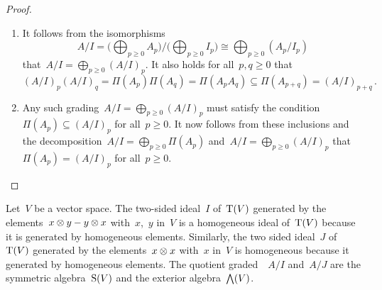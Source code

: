 \begin{proof}
  \leavevmode
  \begin{enumerate}
    \item
      It follows from the isomorphisms
      \[
        A/I
        =
        \Biggl( \bigoplus_{p \geq 0} A_p \Biggr)
        \bigg/
        \Biggl( \bigoplus_{p \geq 0} I_p \Biggr)
        \cong
        \bigoplus_{p \geq 0} (A_p / I_p)
      \]
      that~$A/I = \bigoplus_{p \geq 0} (A/I)_p$.
      It also holds for all~$p, q \geq 0$ that
      \[
        (A/I)_p (A/I)_q
        =
        \Pi(A_p) \Pi(A_q)
        =
        \Pi(A_p A_q)
        \subseteq
        \Pi( A_{p+q} )
        =
        (A/I)_{p+q} \,.
      \]
    \item
      Any such grading~$A/I = \bigoplus_{p \geq 0} (A/I)_p$ must satisfy the condition~$\Pi(A_p) \subseteq (A/I)_p$ for all~$p \geq 0$.
      It now follows from these inclusions and the decomposition~$A/I = \bigoplus_{p \geq 0} \Pi(A_p)$ and~$A/I = \bigoplus_{p \geq 0} (A/I)_p$ that~$\Pi(A_p) = (A/I)_p$ for all~$p \geq 0$.
    \qedhere
  \end{enumerate}
\end{proof}


\begin{examples}
  Let~$V$ be a vector space.
  The two-sided ideal~$I$ of~$\operatorname{T}(V)$ generated by the elements~$x \otimes y - y \otimes x$ with~$x$,~$y$ in~$V$ is a homogeneous ideal of~$\operatorname{T}(V)$ because it is generated by homogeneous elements.
  Similarly, the two sided ideal~$J$ of~$\operatorname{T}(V)$ generated by the elements~$x \otimes x$ with~$x$ in~$V$ is homogeneous because it generated by homogeneous elements.
  The quotient graded~{\algebras{$\kf$}}~$A/I$ and~$A/J$ are the symmetric algebra~$\operatorname{S}(V)$ and the exterior algebra~$\operatorname{\bigwedge}(V)$.
\end{examples}


